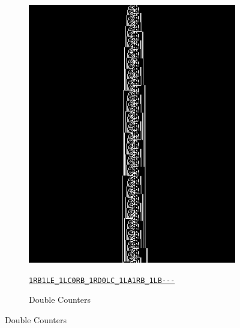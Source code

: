 \documentclass[a4paper,british]{article}
\theoremstyle{definition} %
\numberwithin{equation}{section}
\theoremstyle{definition} %
\newcommand{\tm}[1]{\href{https://bbchallenge.org/#1}{\texttt{\nolinkurl{#1}}}}
\begin{document}
\begin{figure}[htbp]
\begin{subfigure}{0.3\textwidth}
        \includegraphics[width=\linewidth]{figures/zoology/double_counter_2_3_1RB1LE_1LC0RB_1RD0LC_1LA1RB_1LB---.png}
        \caption*{Double Counters}
        {\scriptsize \tm{1RB1LE_1LC0RB_1RD0LC_1LA1RB_1LB---}}
    \end{subfigure}

    \vspace{0.5cm}


\end{figure}
\end{document}

